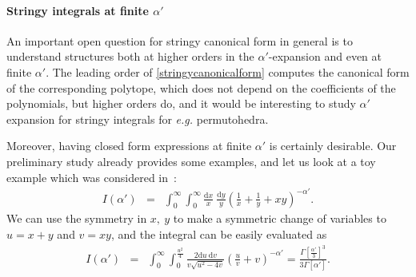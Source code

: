 \documentclass[hidelinks,12pt]{article}
\newcommand{\bea}[1]{\begin{eqnarray}\label{#1} }
\newcommand{\eea}{\end{eqnarray}}
\def\bea{\begin{eqnarray}}
\def\eea{\end{eqnarray}}
\begin{document}
\paragraph{Stringy integrals at finite $\alpha'$}

An important open question for stringy canonical form in general is to understand structures both at higher orders in the $\alpha'$-expansion and even at finite $\alpha'$. 
The leading order of \eqref{stringycanonicalform} computes the canonical form of the corresponding polytope, which does not depend on the coefficients of the polynomials, but higher orders do, and it would be interesting to study $\alpha'$ expansion for stringy integrals for {\it e.g.} permutohedra. 
 
Moreover, having closed form expressions at finite $\alpha'$ is certainly desirable. Our preliminary study already provides some examples, and let us look at a toy example which was considered in~\cite{Arkani-Hamed:2019mrd}:
 \bea
I(\alpha') &=& \int_{0}^{\infty} \int_{0}^{\infty} \frac{\mathrm{d}x}{x} ~\frac{\mathrm{d}y}{y} \left( \frac{1}{x} + \frac{1}{y}+ x y \right)^{-\alpha' }. \nonumber 
\eea 
We can use the symmetry in $x,~y$ to make a symmetric change of variables to $u=x+y$ and $v =x y$, and the integral can be easily evaluated as
 \bea
I(\alpha') &=& \int_{0}^{\infty} \int_{0}^{\frac{u^2}{4}} \frac{2 \mathrm{d}u ~ \mathrm{d}v}{v \sqrt{u^2-4 v} }\left( \frac{u}{v} + v  \right)^{-\alpha'}= \frac{\Gamma{\left[\frac{\alpha'}{3}\right]^{3}}}{3 \Gamma{ \left[\alpha'\right]}}. \nonumber
\eea
%
\end{document}
